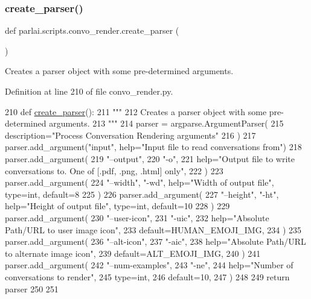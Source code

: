 \subsubsection{\texorpdfstring{create\+\_\+parser()}{create\_parser()}}
{\footnotesize\ttfamily def parlai.\+scripts.\+convo\+\_\+render.\+create\+\_\+parser (\begin{DoxyParamCaption}{ }\end{DoxyParamCaption})}

\begin{DoxyVerb}Creates a parser object with some pre-determined arguments.
\end{DoxyVerb}
 

Definition at line 210 of file convo\+\_\+render.\+py.


\begin{DoxyCode}
210 \textcolor{keyword}{def }\hyperlink{namespaceparlai_1_1scripts_1_1convo__render_a4220e40f3e0c5ac320177b6e0f3d8e83}{create\_parser}():
211     \textcolor{stringliteral}{"""}
212 \textcolor{stringliteral}{    Creates a parser object with some pre-determined arguments.}
213 \textcolor{stringliteral}{    """}
214     parser = argparse.ArgumentParser(
215         description=\textcolor{stringliteral}{"Process Conversation Rendering arguments"}
216     )
217     parser.add\_argument(\textcolor{stringliteral}{"input"}, help=\textcolor{stringliteral}{"Input file to read conversations from"})
218     parser.add\_argument(
219         \textcolor{stringliteral}{"--output"},
220         \textcolor{stringliteral}{"-o"},
221         help=\textcolor{stringliteral}{"Output file to write conversations to. One of [.pdf, .png, .html] only"},
222     )
223     parser.add\_argument(
224         \textcolor{stringliteral}{"--width"}, \textcolor{stringliteral}{"-wd"}, help=\textcolor{stringliteral}{"Width of output file"}, type=int, default=8
225     )
226     parser.add\_argument(
227         \textcolor{stringliteral}{"--height"}, \textcolor{stringliteral}{"-ht"}, help=\textcolor{stringliteral}{"Height of output file"}, type=int, default=10
228     )
229     parser.add\_argument(
230         \textcolor{stringliteral}{"--user-icon"},
231         \textcolor{stringliteral}{"-uic"},
232         help=\textcolor{stringliteral}{"Absolute Path/URL to user image icon"},
233         default=HUMAN\_EMOJI\_IMG,
234     )
235     parser.add\_argument(
236         \textcolor{stringliteral}{"--alt-icon"},
237         \textcolor{stringliteral}{"-aic"},
238         help=\textcolor{stringliteral}{"Absolute Path/URL to alternate image icon"},
239         default=ALT\_EMOJI\_IMG,
240     )
241     parser.add\_argument(
242         \textcolor{stringliteral}{"--num-examples"},
243         \textcolor{stringliteral}{"-ne"},
244         help=\textcolor{stringliteral}{"Number of conversations to render"},
245         type=int,
246         default=10,
247     )
248 
249     \textcolor{keywordflow}{return} parser
250 
251 
\end{DoxyCode}
